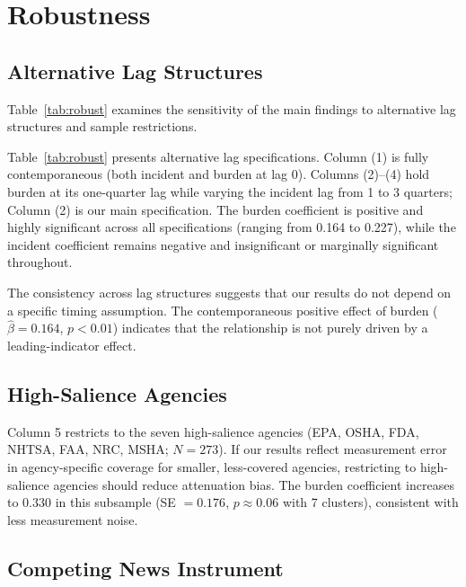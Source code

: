 \documentclass[12pt]{article}
\begin{document}
\section{Robustness}
\label{sec:robustness}

\subsection{Alternative Lag Structures}

Table~\ref{tab:robust} examines the sensitivity of the main findings to alternative lag structures and sample restrictions.

\begin{landscape}

\end{landscape}

Table~\ref{tab:robust} presents alternative lag specifications. Column (1) is fully contemporaneous (both incident and burden at lag 0). Columns (2)--(4) hold burden at its one-quarter lag while varying the incident lag from 1 to 3 quarters; Column (2) is our main specification. The burden coefficient is positive and highly significant across all specifications (ranging from 0.164 to 0.227), while the incident coefficient remains negative and insignificant or marginally significant throughout.

The consistency across lag structures suggests that our results do not depend on a specific timing assumption. The contemporaneous positive effect of burden ($\hat\beta = 0.164$, $p < 0.01$) indicates that the relationship is not purely driven by a leading-indicator effect.

\subsection{High-Salience Agencies}

Column 5 restricts to the seven high-salience agencies (EPA, OSHA, FDA, NHTSA, FAA, NRC, MSHA; $N = 273$). If our results reflect measurement error in agency-specific coverage for smaller, less-covered agencies, restricting to high-salience agencies should reduce attenuation bias. The burden coefficient increases to $0.330$ in this subsample (SE $= 0.176$, $p \approx 0.06$ with 7 clusters), consistent with less measurement noise.

\subsection{Competing News Instrument}
\end{document}
